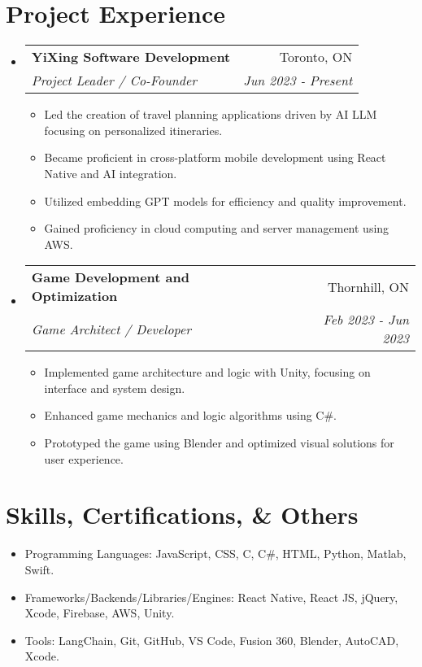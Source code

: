 \documentclass[letterpaper,11pt]{article}
\makeatletter
\newcommand{\resumeItem}[1]{
  \item\small{
    {#1 \vspace{-5pt}}
  }
}
\newcommand{\resumeSubheading}[4]{
  \vspace{-2pt}\item
    \begin{tabular*}{0.97\textwidth}[t]{l@{\extracolsep{\fill}}r}
      \textbf{#1} & #2 \\
      \textit{\small#3} & \textit{\small #4} \\
    \end{tabular*}\vspace{-7pt}
}
\newcommand{\resumeSubItem}[1]{\resumeItem{#1}\vspace{-4pt}}
\newcommand{\resumeSubHeadingListStart}{\begin{itemize}[leftmargin=0.15in, label={}]}
\newcommand{\resumeSubHeadingListEnd}{\end{itemize}}
\newcommand{\resumeItemListStart}{\begin{itemize}}
\newcommand{\resumeItemListEnd}{\end{itemize}\vspace{-5pt}}
\makeatother
\begin{document}
\section{Project Experience}
\resumeSubHeadingListStart
  \resumeSubheading
  {YiXing Software Development}{Toronto, ON}
  {Project Leader / Co-Founder}{Jun 2023 - Present}
  \resumeItemListStart
    \resumeItem{Led the creation of travel planning applications driven by AI LLM focusing on personalized itineraries.}
    \resumeItem{Became proficient in cross-platform mobile development using React Native and AI integration.}
    \resumeItem{Utilized embedding GPT models for efficiency and quality improvement.}
    \resumeItem{Gained proficiency in cloud computing and server management using AWS.}
  \resumeItemListEnd

  \resumeSubheading
  {Game Development and Optimization}{Thornhill, ON}
  {Game Architect / Developer}{Feb 2023 - Jun 2023}
  \resumeItemListStart
    \resumeItem{Implemented game architecture and logic with Unity, focusing on interface and system design.}
    \resumeItem{Enhanced game mechanics and logic algorithms using C\#.}
    \resumeItem{Prototyped the game using Blender and optimized visual solutions for user experience.}
  \resumeItemListEnd
\resumeSubHeadingListEnd

\section{Skills, Certifications, \& Others}
\resumeSubHeadingListStart
  \resumeSubItem{Programming Languages: JavaScript, CSS, C, C\#, HTML, Python, Matlab, Swift.}
  \resumeSubItem{Frameworks/Backends/Libraries/Engines: React Native, React JS, jQuery, Xcode, Firebase, AWS, Unity.}
  \resumeSubItem{Tools: LangChain, Git, GitHub, VS Code, Fusion 360, Blender, AutoCAD, Xcode.}
\resumeSubHeadingListEnd
\end{document}
